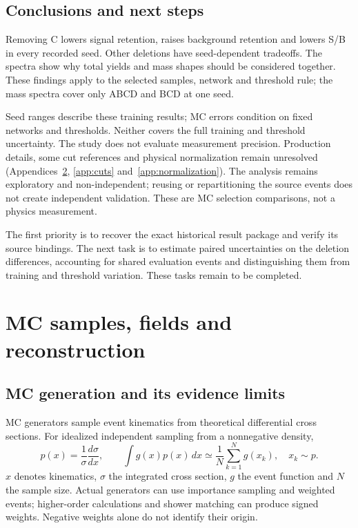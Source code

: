 \documentclass[11pt,a4paper]{article}
\begin{document}
\begin{samepage}
\section{Conclusions and next steps}\label{sec:conclusion}
Removing C lowers signal retention, raises background retention and lowers S/B in every recorded seed. Other deletions have seed-dependent tradeoffs.
The spectra show why total yields and mass shapes should be considered together.
These findings apply to the selected samples, network and threshold rule; the mass spectra cover only ABCD and BCD at one seed.

Seed ranges describe these training results; MC errors condition on fixed networks and thresholds.
Neither covers the full training and threshold uncertainty. The study does not evaluate measurement precision.
Production details, some cut references and physical normalization remain unresolved (Appendices~\ref{app:fields}, \ref{app:cuts} and~\ref{app:normalization}).
The analysis remains exploratory and non-independent; reusing or repartitioning the source events does not create independent validation. These are MC selection comparisons, not a physics measurement.

The first priority is to recover the exact historical result package and verify its source bindings.
The next task is to estimate paired uncertainties on the deletion differences, accounting for shared evaluation events and distinguishing them from training and threshold variation.
These tasks remain to be completed.
\end{samepage}

\setlength{\parskip}{4pt}
\appendix
\section{MC samples, fields and reconstruction}\label{app:fields}

\subsection{MC generation and its evidence limits}\label{app:mc-generation}
MC generators sample event kinematics from theoretical differential cross sections.
For idealized independent sampling from a nonnegative density,
\[
 p(x)=\frac{1}{\sigma}\frac{d\sigma}{dx},\qquad
 \int g(x)p(x)\,dx\simeq\frac{1}{N}\sum_{k=1}^{N}g(x_k),\quad x_k\sim p.
\]
$x$ denotes kinematics, $\sigma$ the integrated cross section, $g$ the event function and $N$ the sample size.
Actual generators can use importance sampling and weighted events; higher-order calculations and shower matching can produce signed weights. Negative weights alone do not identify their origin.
\end{document}
